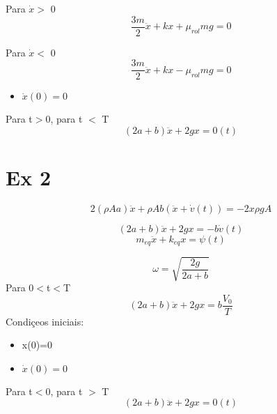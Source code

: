 
Para $\dot{x}>$  0
\[\frac{3m}{2}\ddot{x}+kx+\mu _{rol}mg=0\]

Para $\dot{x}<$  0
\[\frac{3m}{2}\ddot{x}+kx-\mu _{rol}mg=0\]

\begin{itemize}
  \item $\dot{x}(0)=0$
\end{itemize}

Para t$>$0, para t $<$ T
\[(2a+b)\ddot{x}+2gx=0(t)\]



\section{Ex 2}





\[2(\rho A a)\ddot{x}+\rho A b(\ddot{x}+\dot{v}(t))=-2x\rho gA\]

\[(2a+b)\ddot{x}+2gx=-b\dot{v}(t)\]
\[m_{eq}\ddot{x}+k_{eq}x=\psi(t)\]

\[\omega = \sqrt{\frac{2g}{2a+b}}\]
Para 0$<$t$<$T
\[(2a+b)\ddot{x}+2gx=b\frac{V_{0}}{T}\]
Condiçeos iniciais:
\begin{itemize}
\item x(0)=0

\item $\dot{x}(0)=0$
\end{itemize}
Para t$<$0, para t $>$ T
\[(2a+b)\ddot{x}+2gx=0(t)\]

